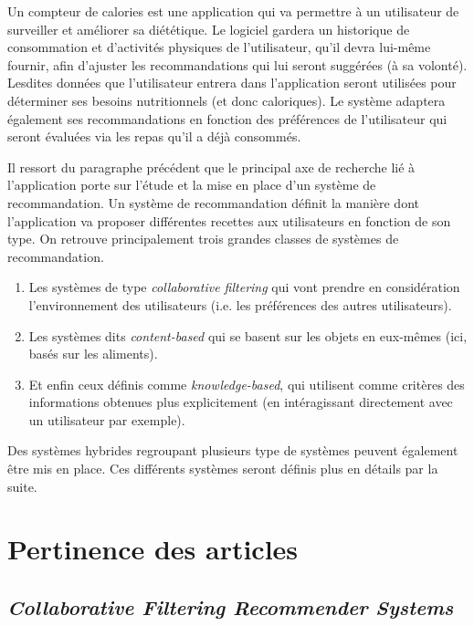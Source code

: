 \documentclass[a4paper, 11pt]{article}
\begin{document}
Un compteur de calories est une application qui va permettre à un utilisateur de surveiller et améliorer sa diététique. Le logiciel gardera un historique de consommation et d'activités physiques de l'utilisateur, qu'il devra lui-même fournir, afin d'ajuster les recommandations qui lui seront suggérées (à sa volonté). Lesdites données que l'utilisateur entrera dans l'application seront utilisées pour déterminer ses besoins nutritionnels (et donc caloriques). Le système adaptera également ses recommandations en fonction des préférences de l'utilisateur qui seront évaluées via les repas qu'il a déjà consommés. \\\par
Il ressort du paragraphe précédent que le principal axe de recherche lié à l'application porte sur l'étude et la mise en place d'un système de recommandation. Un système de recommandation définit la manière dont l'application va proposer différentes recettes aux utilisateurs en fonction de son type. On retrouve principalement trois grandes classes de systèmes de recommandation.
\begin{enumerate}
	\item Les systèmes de type \textit{collaborative filtering} qui vont prendre en considération l'environnement des utilisateurs (i.e. les préférences des autres utilisateurs). 
	\item Les systèmes dits \textit{content-based} qui se basent sur les objets en eux-mêmes (ici, basés sur les aliments). 
	\item Et enfin ceux définis comme \textit{knowledge-based}, qui utilisent comme critères des informations obtenues plus explicitement (en intéragissant directement avec un utilisateur par exemple). 
\end{enumerate}
Des systèmes hybrides regroupant plusieurs type de systèmes peuvent également être mis en place. Ces différents systèmes seront définis plus en détails par la suite. \\[0.2cm]


\newpage

\section{Pertinence des articles}
\subsection{\textit{Collaborative Filtering Recommender Systems} \cite{collabofiltering}}
\end{document}
